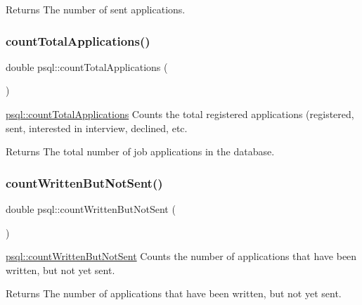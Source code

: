 \begin{DoxyReturn}{Returns}
The number of sent applications. 
\end{DoxyReturn}
\mbox{\label{classpsql_a496d0a426a1539bf9babd1dd4e9fcd96}} 
\subsubsection{\texorpdfstring{countTotalApplications()}{countTotalApplications()}}
{\footnotesize\ttfamily double psql\+::count\+Total\+Applications (\begin{DoxyParamCaption}{ }\end{DoxyParamCaption})}



\mbox{\hyperlink{classpsql_a496d0a426a1539bf9babd1dd4e9fcd96}{psql\+::count\+Total\+Applications}} Counts the total registered applications (registered, sent, interested in interview, declined, etc. 

\begin{DoxyReturn}{Returns}
The total number of job applications in the database. 
\end{DoxyReturn}
\mbox{\label{classpsql_a70ad9f4b00735a55232f46da4edd2edc}} 
\subsubsection{\texorpdfstring{countWrittenButNotSent()}{countWrittenButNotSent()}}
{\footnotesize\ttfamily double psql\+::count\+Written\+But\+Not\+Sent (\begin{DoxyParamCaption}{ }\end{DoxyParamCaption})}



\mbox{\hyperlink{classpsql_a70ad9f4b00735a55232f46da4edd2edc}{psql\+::count\+Written\+But\+Not\+Sent}} Counts the number of applications that have been written, but not yet sent. 

\begin{DoxyReturn}{Returns}
The number of applications that have been written, but not yet sent. 
\end{DoxyReturn}
\mbox{\label{classpsql_ae9e3ee06f4a5ecd4178662dfa0655fe1}} 
